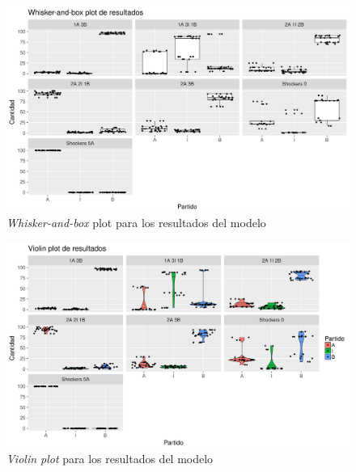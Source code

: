 \begin{figure}[!h]
\centering
\includegraphics[scale=0.5]{imagenes/histograma_resultados.png}
    \caption{\textit{Whisker-and-box} plot para los resultados del modelo}
\label{fig:modelo_shock_box}
\end{figure}

\begin{figure}[!h]
\centering
\includegraphics[scale=0.5]{imagenes/violin_resultados.png}
\caption{\textit{Violin plot} para los resultados del modelo}
\label{fig:modelo_shock_violin}
\end{figure}


